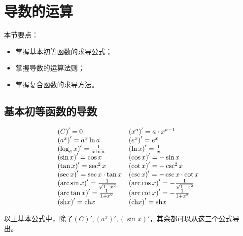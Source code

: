 \section{导数的运算}

本节要点：
\begin{itemize}
    \item 掌握基本初等函数的求导公式；
    \item 掌握导数的运算法则；
    \item 掌握复合函数的求导方法。
\end{itemize}

\subsection{基本初等函数的导数}

\begin{align*}
\begin{matrix}
	\left( C \right) '=0 \hfill                                       & \left( x^a \right) '=a\cdot x^{a-1} \hfill \\
	\left( a^x \right) '=a^x\ln a \hfill                              & \left( e^x \right) '=e^x \hfill \\
	\left( \log _ax \right) '=\frac{1}{x\ln a} \hfill                 & \left( \ln x \right) '=\frac{1}{x} \hfill \\
	\left( \sin x \right) '=\cos x \hfill                             & \left( \cos x \right) '=-\sin x \hfill \\
	\left( \tan x \right) '=\sec ^2x \hfill                           & \left( \cot x \right) '=-\csc ^2x \hfill \\
	\left( \sec x \right) '=\sec x\cdot \tan x \hfill                 & \left( \csc x \right) '=-\csc x\cdot \cot x \hfill \\
	\left( \mathrm{arc}\sin x \right) '=\frac{1}{\sqrt{1-x^2}} \hfill & \left( \mathrm{arc}\cos x \right) '=-\frac{1}{\sqrt{1-x^2}} \hfill \\
	\left( \mathrm{arc}\tan x \right) '=\frac{1}{1+x^2} \hfill        & \left( \mathrm{arc}\cot x \right) '=-\frac{1}{1+x^2} \hfill \\
	\left( \mathrm{sh}x \right) '=\mathrm{ch}x \hfill                 & \left( \mathrm{ch}x \right) '=\mathrm{sh}x \hfill \\
\end{matrix}
\end{align*}

以上基本公式中，除了$\left( C \right) ',\left( a^x \right) ',\left( \sin x \right) '$，其余都可以从这三个公式导出。

